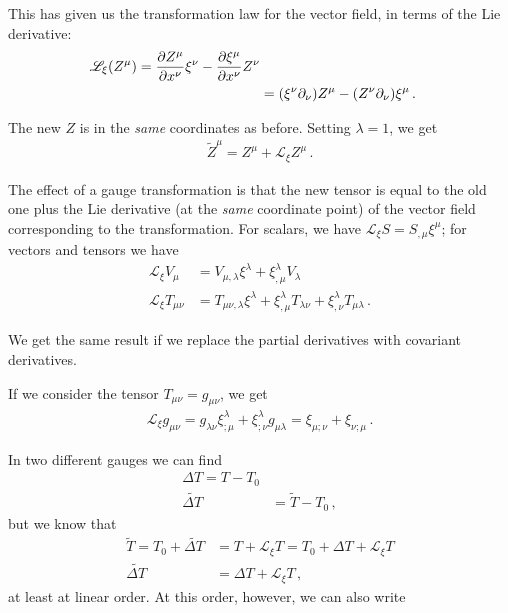 \documentclass[main.tex]{subfiles}
\begin{document}
This has given us the transformation law for the vector field, in terms of the Lie derivative: 
%
\begin{align}
\mathscr{L}_\xi (Z^{\mu }) = \pdv{Z^{\mu }}{x^{\nu }} \xi^{\nu } - \pdv{\xi^{\mu }}{x^{\nu }} Z^{\nu }  \\
&= (\xi^{\nu } \partial_{\nu }) Z^{\mu } - (Z^{\nu }\partial_\nu ) \xi^{\mu }
\,.
\end{align}

The new \(Z\) is in the \emph{same} coordinates as before. Setting \(\lambda = 1\), we get 
%
\begin{align}
\widetilde{Z}^{\mu } = Z^{\mu } + \mathscr{L}_\xi Z^{\mu }
\,.
\end{align}

The effect of a gauge transformation is that the new tensor is equal to the old one plus the Lie derivative (at the \emph{same} coordinate point) of the vector field corresponding to the transformation. 
For scalars, we have \(\mathscr{L}_\xi S = S_{, \mu } \xi^{\mu }\); for vectors and tensors we have 
%
\begin{align}
\mathscr{L}_\xi V_{\mu } &= V_{\mu , \lambda } \xi^{\lambda } + \xi^{\lambda }_{, \mu } V_{\lambda }  \\
\mathscr{L}_\xi T_{\mu \nu } &= T_{\mu \nu , \lambda } \xi^{\lambda } + \xi^{\lambda }_{, \mu } T_{\lambda \nu } + \xi^{\lambda }_{, \nu } T_{\mu \lambda }
\,.
\end{align}

We get the same result if we replace the partial derivatives with covariant derivatives. 

If we consider the tensor \(T_{\mu \nu } = g_{\mu \nu }\), we get 
%
\begin{align}
\mathscr{L}_\xi g_{\mu \nu } = g_{\lambda \nu } \xi^{\lambda }_{; \mu } + \xi^{\lambda }_{; \nu } g_{\mu \lambda } = \xi_{\mu ; \nu } + \xi_{\nu ; \mu }
\,.
\end{align}

In two different gauges we can find 
%
\begin{align}
\Delta T = T - T_0  \\
\widetilde{\Delta T} &= \widetilde{T} - T_0 
\,,
\end{align}
%
but we know that 
%
\begin{align}
\widetilde{T} = T_0 + \widetilde{\Delta T}  &= T + \mathscr{L}_\xi T = T_0 + \Delta T + \mathscr{L}_\xi T  \\
\widetilde{\Delta T} &= \Delta T + \mathscr{L}_\xi T
\,,
\end{align}
%
at least at linear order. At this order, however, we can also write 
\end{document}
